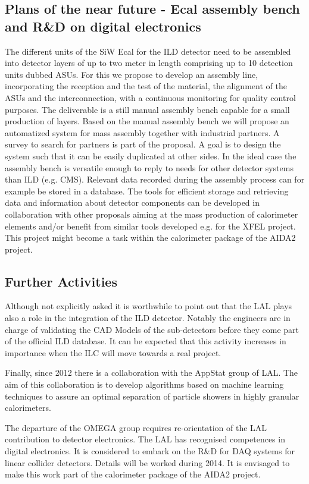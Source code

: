 \subsection{Plans of the near future - Ecal assembly bench and R\&D on digital electronics}
The different units of the SiW Ecal for the ILD detector need to be assembled into detector layers of up to two meter in length comprising up to 10 detection units dubbed ASUs. For this we propose to develop an assembly line, incorporating the reception and the test of the material, the alignment of the ASUs and the interconnection, with a continuous monitoring for quality control purposes. The deliverable is a still manual assembly bench capable for a small production of layers. Based on the manual assembly bench we will propose an automatized system for mass assembly together with industrial partners. A survey to search for partners is part of the proposal. A goal is to design the system such that it can be easily duplicated at other sides. In the ideal case the assembly bench is versatile enough to reply to needs for other detector systems than ILD (e.g. CMS). Relevant data recorded during the assembly process can for example be stored in a database. The tools for efficient storage and retrieving data and information about detector components can be developed in collaboration with other proposals aiming at the mass production of calorimeter elements and/or benefit from similar tools developed e.g. for the XFEL project. This project might become a task within the calorimeter package of the AIDA2 project.


\subsection{Further Activities}
Although not explicitly asked it is worthwhile to point out that the LAL plays also a role in the integration of the ILD detector. Notably the engineers are in charge of validating the CAD Models of the sub-detectors before they come part of the official ILD database. It can be expected that this activity increases in importance when the ILC will move towards a real project.

Finally, since 2012 there is a collaboration with the AppStat group of LAL. The aim of this collaboration is to develop algorithms based on machine learning techniques to assure an optimal separation of particle showers in highly granular calorimeters.

The departure of the OMEGA group requires re-orientation of the LAL contribution to detector electronics. The LAL has recognised competences in digital electronics. It is considered to embark on the R\&D for DAQ systems for linear collider detectors. Details will be worked during 2014. It is envisaged to make this work part of the calorimeter package of the AIDA2 project.

